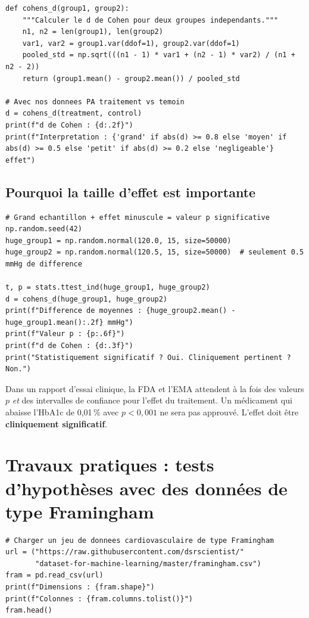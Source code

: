\begin{verbatim}
def cohens_d(group1, group2):
    """Calculer le d de Cohen pour deux groupes independants."""
    n1, n2 = len(group1), len(group2)
    var1, var2 = group1.var(ddof=1), group2.var(ddof=1)
    pooled_std = np.sqrt(((n1 - 1) * var1 + (n2 - 1) * var2) / (n1 + n2 - 2))
    return (group1.mean() - group2.mean()) / pooled_std

# Avec nos donnees PA traitement vs temoin
d = cohens_d(treatment, control)
print(f"d de Cohen : {d:.2f}")
print(f"Interpretation : {'grand' if abs(d) >= 0.8 else 'moyen' if abs(d) >= 0.5 else 'petit' if abs(d) >= 0.2 else 'negligeable'} effet")
\end{verbatim}

\subsection{Pourquoi la taille d'effet est importante}

\begin{verbatim}
# Grand echantillon + effet minuscule = valeur p significative
np.random.seed(42)
huge_group1 = np.random.normal(120.0, 15, size=50000)
huge_group2 = np.random.normal(120.5, 15, size=50000)  # seulement 0.5 mmHg de difference

t, p = stats.ttest_ind(huge_group1, huge_group2)
d = cohens_d(huge_group1, huge_group2)
print(f"Difference de moyennes : {huge_group2.mean() - huge_group1.mean():.2f} mmHg")
print(f"Valeur p : {p:.6f}")
print(f"d de Cohen : {d:.3f}")
print("Statistiquement significatif ? Oui. Cliniquement pertinent ? Non.")
\end{verbatim}

\begin{clinicalnote}
Dans un rapport d'essai clinique, la FDA et l'EMA attendent \`a la fois des valeurs $p$ \emph{et} des intervalles de confiance pour l'effet du traitement. Un m\'edicament qui abaisse l'HbA1c de 0,01\,\% avec $p < 0{,}001$ ne sera pas approuv\'e. L'effet doit \^etre \textbf{cliniquement significatif}.
\end{clinicalnote}

\section{Travaux pratiques : tests d'hypoth\`eses avec des donn\'ees de type Framingham}

\begin{verbatim}
# Charger un jeu de donnees cardiovasculaire de type Framingham
url = ("https://raw.githubusercontent.com/dsrscientist/"
       "dataset-for-machine-learning/master/framingham.csv")
fram = pd.read_csv(url)
print(f"Dimensions : {fram.shape}")
print(f"Colonnes : {fram.columns.tolist()}")
fram.head()
\end{verbatim}

